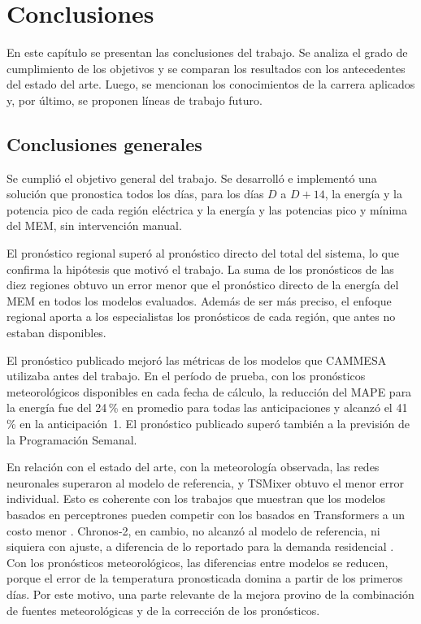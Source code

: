 
\chapter{Conclusiones} %

\label{Chapter5} %

En este capítulo se presentan las conclusiones del trabajo. Se analiza el grado de cumplimiento de los objetivos y se comparan los resultados con los antecedentes del estado del arte. Luego, se mencionan los conocimientos de la carrera aplicados y, por último, se proponen líneas de trabajo futuro.

\section{Conclusiones generales}
\label{sec:logros}

Se cumplió el objetivo general del trabajo. Se desarrolló e implementó una solución que pronostica todos los días, para los días $D$ a $D+14$, la energía y la potencia pico de cada región eléctrica y la energía y las potencias pico y mínima del MEM, sin intervención manual.

El pronóstico regional superó al pronóstico directo del total del sistema, lo que confirma la hipótesis que motivó el trabajo. La suma de los pronósticos de las diez regiones obtuvo un error menor que el pronóstico directo de la energía del MEM en todos los modelos evaluados. Además de ser más preciso, el enfoque regional aporta a los especialistas los pronósticos de cada región, que antes no estaban disponibles.

El pronóstico publicado mejoró las métricas de los modelos que CAMMESA utilizaba antes del trabajo. En el período de prueba, con los pronósticos meteorológicos disponibles en cada fecha de cálculo, la reducción del MAPE para la energía fue del 24\,\% en promedio para todas las anticipaciones y alcanzó el 41\,\% en la anticipación~1. El pronóstico publicado superó también a la previsión de la Programación Semanal.

En relación con el estado del arte, con la meteorología observada, las redes neuronales superaron al modelo de referencia, y TSMixer obtuvo el menor error individual. Esto es coherente con los trabajos que muestran que los modelos basados en perceptrones pueden competir con los basados en Transformers a un costo menor \cite{das2023tide,chen2023tsmixer}. Chronos-2, en cambio, no alcanzó al modelo de referencia, ni siquiera con ajuste, a diferencia de lo reportado para la demanda residencial \cite{meyer2025foundationload}. Con los pronósticos meteorológicos, las diferencias entre modelos se reducen, porque el error de la temperatura pronosticada domina a partir de los primeros días. Por este motivo, una parte relevante de la mejora provino de la combinación de fuentes meteorológicas y de la corrección de los pronósticos.

